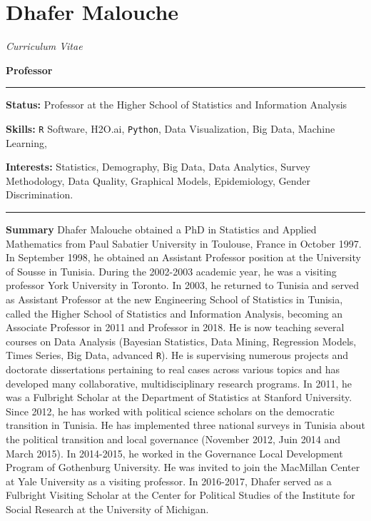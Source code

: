 \documentclass[]{article}
\title{}
\author{}
\date{}
\begin{document}
\section{Dhafer Malouche}\label{dhafer-malouche}

\emph{Curriculum Vitae}

\textbf{Professor}

\begin{center}\rule{0.5\linewidth}{\linethickness}\end{center}

\textbf{Status:} Professor at the Higher School of Statistics and
Information Analysis

\textbf{Skills:} \texttt{R} Software, H2O.ai, \texttt{Python}, Data
Visualization, Big Data, Machine Learning,

\textbf{Interests:} Statistics, Demography, Big Data, Data Analytics,
Survey Methodology, Data Quality, Graphical Models, Epidemiology, Gender
Discrimination.

\begin{center}\rule{0.5\linewidth}{\linethickness}\end{center}

\textbf{Summary} Dhafer Malouche obtained a PhD in Statistics and
Applied Mathematics from Paul Sabatier University in Toulouse, France in
October 1997. In September 1998, he obtained an Assistant Professor
position at the University of Sousse in Tunisia. During the 2002-2003
academic year, he was a visiting professor York University in Toronto.
In 2003, he returned to Tunisia and served as Assistant Professor at the
new Engineering School of Statistics in Tunisia, called the Higher
School of Statistics and Information Analysis, becoming an Associate
Professor in 2011 and Professor in 2018. He is now teaching several
courses on Data Analysis (Bayesian Statistics, Data Mining, Regression
Models, Times Series, Big Data, advanced \texttt{R}). He is supervising
numerous projects and doctorate dissertations pertaining to real cases
across various topics and has developed many collaborative,
multidisciplinary research programs. In 2011, he was a Fulbright Scholar
at the Department of Statistics at Stanford University. Since 2012, he
has worked with political science scholars on the democratic transition
in Tunisia. He has implemented three national surveys in Tunisia about
the political transition and local governance (November 2012, Juin 2014
and March 2015). In 2014-2015, he worked in the Governance Local
Development Program of Gothenburg University. He was invited to join the
MacMillan Center at Yale University as a visiting professor. In
2016-2017, Dhafer served as a Fulbright Visiting Scholar at the Center
for Political Studies of the Institute for Social Research at the
University of Michigan.
\end{document}
